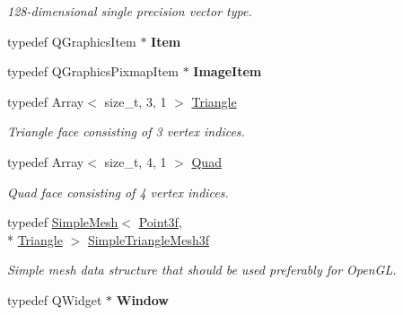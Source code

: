 \begin{DoxyCompactItemize}
\begin{DoxyCompactList}\small\item\em 128-\/dimensional single precision vector type. \end{DoxyCompactList}\item 
\hypertarget{namespace_d_o_a5a21ac561ec88253897fb5a7bfd7ca7d}{typedef Q\-Graphics\-Item $\ast$ {\bfseries Item}}\label{namespace_d_o_a5a21ac561ec88253897fb5a7bfd7ca7d}

\item 
\hypertarget{namespace_d_o_adc42f317a433145f1da2c479eea658be}{typedef Q\-Graphics\-Pixmap\-Item $\ast$ {\bfseries Image\-Item}}\label{namespace_d_o_adc42f317a433145f1da2c479eea658be}

\item 
\hypertarget{group___draw3_d_ga0ca67ac512a882951211499a31ab60a0}{typedef Array$<$ size\-\_\-t, 3, 1 $>$ \hyperlink{group___draw3_d_ga0ca67ac512a882951211499a31ab60a0}{Triangle}}\label{group___draw3_d_ga0ca67ac512a882951211499a31ab60a0}

\begin{DoxyCompactList}\small\item\em Triangle face consisting of 3 vertex indices. \end{DoxyCompactList}\item 
\hypertarget{group___draw3_d_gae5a923c17de7c04456eb0c0e9c0537e4}{typedef Array$<$ size\-\_\-t, 4, 1 $>$ \hyperlink{group___draw3_d_gae5a923c17de7c04456eb0c0e9c0537e4}{Quad}}\label{group___draw3_d_gae5a923c17de7c04456eb0c0e9c0537e4}

\begin{DoxyCompactList}\small\item\em Quad face consisting of 4 vertex indices. \end{DoxyCompactList}\item 
\hypertarget{group___draw3_d_ga4f1ab8c8365dc907bff111a6f87e6141}{typedef \hyperlink{class_d_o_1_1_simple_mesh}{Simple\-Mesh}$<$ \hyperlink{group___eigen_typedefs_gad660f7355dc0f792adc7d7717e9664cb}{Point3f}, \\*
\hyperlink{group___draw3_d_ga0ca67ac512a882951211499a31ab60a0}{Triangle} $>$ \hyperlink{group___draw3_d_ga4f1ab8c8365dc907bff111a6f87e6141}{Simple\-Triangle\-Mesh3f}}\label{group___draw3_d_ga4f1ab8c8365dc907bff111a6f87e6141}

\begin{DoxyCompactList}\small\item\em Simple mesh data structure that should be used preferably for Open\-G\-L. \end{DoxyCompactList}\item 
\hypertarget{namespace_d_o_a418328ff7ee8d2f5235ab760b9c5a874}{typedef Q\-Widget $\ast$ {\bfseries Window}}\label{namespace_d_o_a418328ff7ee8d2f5235ab760b9c5a874}

\end{DoxyCompactItemize}
